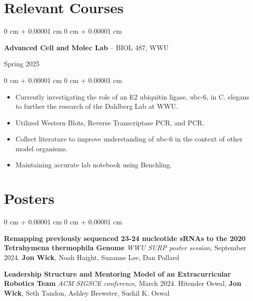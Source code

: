 \documentclass[10pt, letterpaper]{article}
\newenvironment{highlights}{
    \begin{itemize}[
        topsep=0.10 cm,
        parsep=0.10 cm,
        partopsep=0pt,
        itemsep=0pt,
        leftmargin=0 cm + 10pt
    ]
}{
    \end{itemize}
} %
\newenvironment{onecolentry}{
    \begin{adjustwidth}{
        0 cm + 0.00001 cm
    }{
        0 cm + 0.00001 cm
    }
}{
    \end{adjustwidth}
} %
\newenvironment{twocolentry}[2][]{
    \onecolentry
    \def\secondColumn{#2}
    \setcolumnwidth{\fill, 4.5 cm}
    \begin{paracol}{2}
}{
    \switchcolumn \raggedleft \secondColumn
    \end{paracol}
    \endonecolentry
} %
\begin{document}
    \section{Relevant Courses}

    \begin{samepage}
    \begin{twocolentry}
      {Spring 2025}
      \textbf{Advanced Cell and Molec Lab} -- BIOL 487, WWU
    \end{twocolentry}
      \begin{onecolentry}
        \begin{highlights}
        \item Currently investigating the role of an E2 ubiquitin ligase, ubc-6, in C. elegans to further the research of the Dahlberg Lab at WWU.
        \item Utilized Western Blots, Reverse Transcriptase PCR, and PCR.
        \item Collect literature to improve understanding of ubc-6 in the context of other model organisms.
        \item Maintaining accurate lab notebook using Benchling.
        \end{highlights}
      \end{onecolentry}


    \end{samepage}

    \section{Posters}





        \begin{onecolentry}
          \textbf{Remapping previously sequenced 23-24 nucleotide sRNAs to the 2020 Tetrahymena thermophila Genome}\newline
          \textit{WWU SURP poster session}, September 2024. \newline
          \textbf{Jon Wick}, Noah Haight, Suzanne Lee, Dan Pollard

          \vspace{0.2cm}

          \textbf{Leadership Structure and Mentoring Model of an Extracurricular Robotics Team} \newline
          \textit{ACM SIGSCE conference}, March 2024.\newline
          Hitender Oswal, \textbf{Jon Wick}, Seth Tandon, Ashley Brewster, Sushil K. Oswal


        \end{onecolentry}
\end{document}
